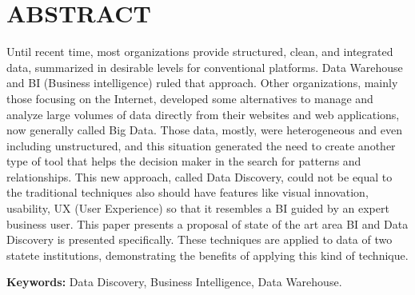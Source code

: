 \chapter*{\centering ABSTRACT}
	Until recent time, most organizations provide structured, clean, and integrated data, summarized in desirable levels for conventional platforms. Data Warehouse and BI (Business intelligence) ruled that approach. Other organizations, mainly those focusing on the Internet, developed some alternatives to manage and analyze large volumes of data directly from their websites and web applications, now generally called Big Data. Those data, mostly, were heterogeneous and even including unstructured, and this situation generated the need to create another type of tool that helps the decision maker in the search for patterns and relationships. This new approach, called Data Discovery, could not be equal to the traditional techniques also should have features like visual innovation, usability, UX (User Experience) so that it resembles a BI guided by an expert business user. This paper presents a proposal of state of the art area BI and Data Discovery is presented specifically. These techniques are applied to data of two statete institutions, demonstrating the benefits of applying this kind of technique.


\vspace*{1\baselineskip}
\textbf{Keywords:} Data Discovery, Business Intelligence, Data Warehouse.